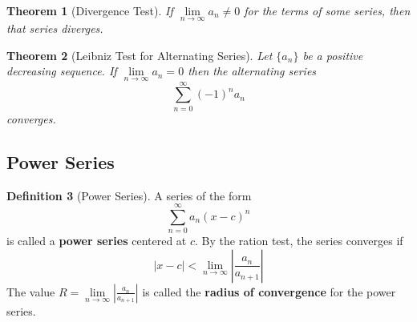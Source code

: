 \documentclass[12pt]{article}
\newtheorem{thm}{Theorem}[section]
\theoremstyle{definition}
\newtheorem{defn}[thm]{Definition}
\theoremstyle{remark}
\numberwithin{equation}{section}
\newcommand\B[1]{\textbf{ #1}}
\begin{document}
\begin{figure}[H]
        \centering
\end{figure}


\vspace{1cm}

\begin{thm}[Divergence Test]
        If $\lim\limits_{n\rightarrow \infty}a_n \neq 0$ for the terms of some series, then that series diverges.
\end{thm}

\vspace{1cm}


\begin{thm}[Leibniz Test for Alternating Series]
        Let $\{a_n\}$ be a positive decreasing sequence. If $\lim\limits_{n\rightarrow \infty}a_n = 0$ then the alternating series \begin{equation}
                \sum\limits_{n=0}^{\infty}(-1)^na_n
        \end{equation}
        converges.
\end{thm}

\vspace{1cm}


\subsection{Power Series}


\begin{defn}[Power Series]
        A series of the form \begin{equation}
                \sum\limits_{n=0}^{\infty}a_n (x-c)^n
        \end{equation}
        is called a \B{power series} centered at $c$. By the ration test, the series converges if \begin{equation}
                |x-c| < \lim\limits_{n\rightarrow \infty}\left|\frac{a_n}{a_{n+1}}\right|
        \end{equation}
        The value $R = \lim\limits_{n\rightarrow \infty}\left|\frac{a_n}{a_{n+1}}\right|$ is called the \B{radius of convergence} for the power series.
\end{defn}
\end{document}
